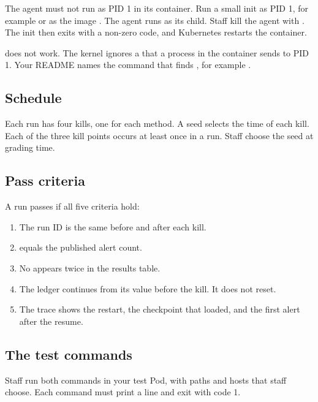 \documentclass[9pt,letterpaper]{article}
\begin{document}
The agent must not run as PID 1 in its container. Run a small init as PID 1,
for example  or  as the image .
The agent runs as its child. Staff kill the agent with
. The init then exits
with a non-zero code, and Kubernetes restarts the container.

 does not work. The kernel ignores a  that a
process in the container sends to PID 1. Your README names the command that
finds , for example .

\subsection{Schedule}\label{sec:schedule}

Each run has four kills, one for each method. A seed selects the time of each
kill. Each of the three kill points occurs at least once in a run. Staff choose
the seed at grading time.

\subsection{Pass criteria}\label{sec:pass}

A run passes if all five criteria hold:
\begin{enumerate}
\item The run ID is the same before and after each kill.
\item {} equals the published alert count.
\item No  appears twice in the results table.
\item The ledger continues from its value before the kill. It does not reset.
\item The trace shows the restart, the checkpoint that loaded, and the first
  alert after the resume.
\end{enumerate}

\subsection{The test commands}\label{sec:stafftests}

Staff run both commands in your test Pod, with paths and hosts that staff choose.
Each command must print a  line and exit with code 1.
\end{document}
